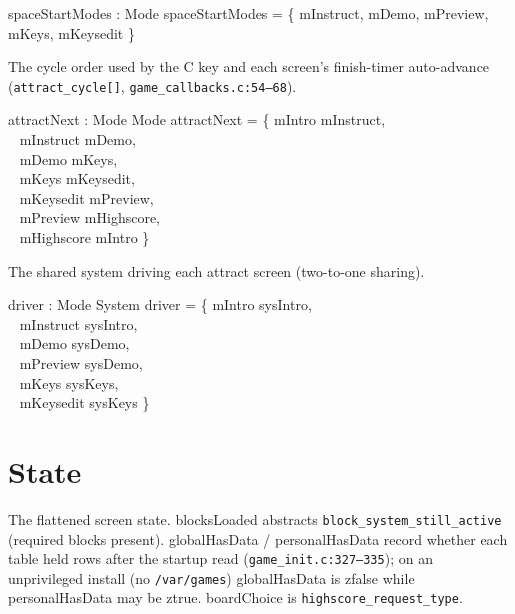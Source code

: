 \documentclass[a4paper,10pt,fleqn]{article}
\begin{document}
\begin{axdef}
  spaceStartModes : \power Mode
  \where
  spaceStartModes = \{ mInstruct, mDemo, mPreview, mKeys, mKeysedit \}
\end{axdef}

The cycle order used by the C key and each screen's finish-timer
auto-advance (\texttt{attract\_cycle[]}, \texttt{game\_callbacks.c:54--68}).

\begin{axdef}
  attractNext : Mode \pfun Mode
  \where
  attractNext = \{ mIntro \mapsto mInstruct, \\
    \quad~ mInstruct \mapsto mDemo, \\
    \quad~ mDemo \mapsto mKeys, \\
    \quad~ mKeys \mapsto mKeysedit, \\
    \quad~ mKeysedit \mapsto mPreview, \\
    \quad~ mPreview \mapsto mHighscore, \\
  \quad~ mHighscore \mapsto mIntro \}
\end{axdef}

The shared system driving each attract screen (two-to-one sharing).

\begin{axdef}
  driver : Mode \pfun System
  \where
  driver = \{ mIntro \mapsto sysIntro, \\
    \quad~ mInstruct \mapsto sysIntro, \\
    \quad~ mDemo \mapsto sysDemo, \\
    \quad~ mPreview \mapsto sysDemo, \\
    \quad~ mKeys \mapsto sysKeys, \\
  \quad~ mKeysedit \mapsto sysKeys \}
\end{axdef}

\section{State}

The flattened screen state.  \textsf{blocksLoaded} abstracts
\texttt{block\_system\_still\_active} (required blocks present).
\textsf{globalHasData} / \textsf{personalHasData} record whether each
table held rows after the startup read
(\texttt{game\_init.c:327--335}); on an unprivileged install (no
\texttt{/var/games}) \textsf{globalHasData} is \textsf{zfalse} while
\textsf{personalHasData} may be \textsf{ztrue}.  \textsf{boardChoice}
is \texttt{highscore\_request\_type}.
\end{document}

